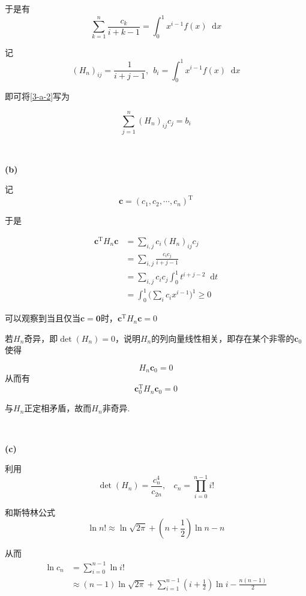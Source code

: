 \documentclass[UTF8]{ctexart}
\newcommand*{\dif}{\mathop{}\!\mathrm{d}}
\begin{document}
于是有
\begin{equation}\label{3-a-2}
\sum_{k=1}^n\frac{c_k}{i+k-1}=\int_0^1 x^{i-1}f(x)\dif x
\end{equation}

记$$(H_n)_{ij}=\frac{1}{i+j-1},\ \ b_i=\int_0^1 x^{i-1}f(x)\dif x$$

即可将\eqref{3-a-2}写为

\begin{equation}\label{3-a-3}
\sum_{j=1}^n (H_n)_{ij}c_j=b_i
\end{equation}

~\

\noindent\textbf{(b)}

记$$\mathbf{c}=(c_1,c_2,\cdots,c_n)^\mathrm{T}$$

于是

\begin{equation}\label{3-b-1}
\begin{aligned}
\mathbf{c}^\mathrm{T}H_n\mathbf{c}&=\sum_{i,j}c_i(H_n)_{ij}c_j\\
&=\sum_{i,j}\frac{c_ic_j}{i+j-1}\\
&=\sum_{i,j}c_ic_j\int_0^1 t^{i+j-2}\dif t\\
&=\int_0^1\Big(\sum_{i}c_i x^{i-1}\Big)^1\geq 0
\end{aligned}
\end{equation}

可以观察到当且仅当$\mathbf{c}=\mathbf{0}$时，$\mathbf{c}^\mathrm{T}H_n\mathbf{c}=0$

若$H_n$奇异，即$\det(H_n)=0$，说明$H_n$的列向量线性相关，即存在某个非零的$\mathbf{c}_0$使得

$$H_n\mathbf{c}_0=0$$
从而有
$$\mathbf{c}_0^\mathrm{T}H_n\mathbf{c}_0=0$$

与$H_n$正定相矛盾，故而$H_n$非奇异.

~\

\noindent\textbf{(c)}

利用$$\det(H_n)=\frac{c_n^4}{c_{2n}},\ \ \ \ c_n=\prod_{i=0}^{n-1}i!$$

和斯特林公式
$$\ln n!\approx \ln\sqrt{2\pi}+(n+\frac{1}{2})\ln n-n$$

从而
\begin{equation}\label{3-c-1}
    \begin{aligned}
        \ln c_n&=\sum_{i=0}^{n-1}\ln i!\\
        &\approx (n-1)\ln\sqrt{2\pi}+\sum_{i=1}^{n-1}(i+\frac{1}{2})\ln i-\frac{n(n-1)}{2}
    \end{aligned}
\end{equation}
\end{document}
